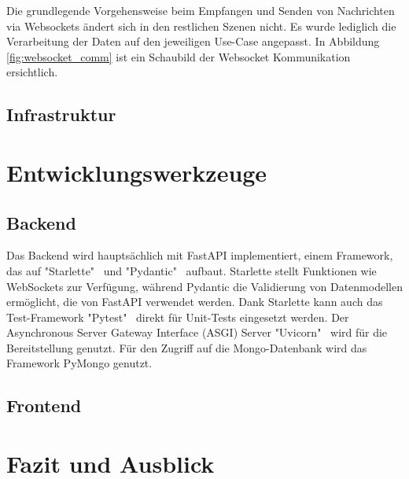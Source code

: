 \documentclass[a4paper, 10pt, conference]{IEEEtran}
\begin{document}
 Die grundlegende Vorgehensweise beim Empfangen und Senden von Nachrichten via Websockets ändert sich in den restlichen Szenen nicht. Es wurde lediglich die Verarbeitung der Daten auf den jeweiligen Use-Case angepasst. In Abbildung \ref{fig:websocket_comm} ist ein Schaubild der Websocket Kommunikation ersichtlich.





\subsection{Infrastruktur}\label{subsec:infrastruktur}





\section{Entwicklungswerkzeuge}\label{sec:entwicklungswerkzeuge}



\subsection{Backend}\label{subsec:backend-dev-tools}
Das Backend wird hauptsächlich mit FastAPI implementiert, einem Framework, das auf "Starlette"~\cite{starlette} und "Pydantic"~\cite{pydantic} aufbaut. Starlette stellt Funktionen wie WebSockets zur Verfügung, während Pydantic die Validierung von Datenmodellen ermöglicht, die von FastAPI verwendet werden. Dank Starlette kann auch das Test-Framework "Pytest"~\cite{pytest} direkt für Unit-Tests eingesetzt werden. Der Asynchronous Server Gateway Interface (ASGI) Server "Uvicorn"~\cite{unvicorn} wird für die Bereitstellung genutzt.
Für den Zugriff auf die Mongo-Datenbank wird das Framework PyMongo genutzt. 




\subsection{Frontend}\label{subsec:frontend-dev-tools}



\section{Fazit und Ausblick}\label{sec:fazit}




\printbibliography
\end{document}
